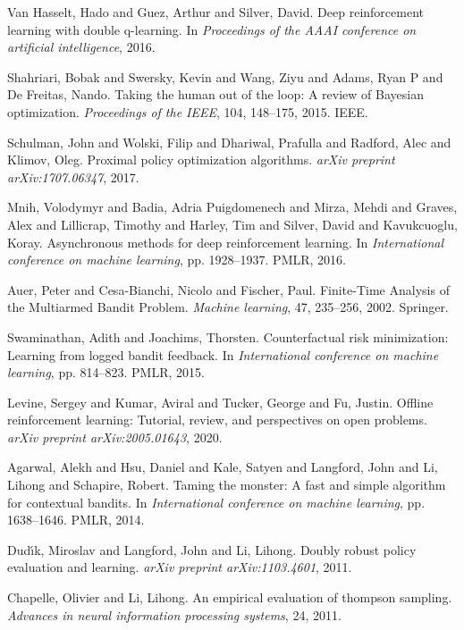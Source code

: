 \begin{thebibliography}{99}
 Van Hasselt, Hado and Guez, Arthur and Silver, David. {D}eep reinforcement learning with double q-learning. In \textit{Proceedings of the AAAI conference on artificial intelligence}, 2016.

 Shahriari, Bobak and Swersky, Kevin and Wang, Ziyu and Adams, Ryan P and De Freitas, Nando. {T}aking the human out of the loop: {A} review of {B}ayesian optimization. \textit{Proceedings of the IEEE}, 104, 148--175, 2015. IEEE.

 Schulman, John and Wolski, Filip and Dhariwal, Prafulla and Radford, Alec and Klimov, Oleg. {P}roximal policy optimization algorithms. \textit{arXiv preprint arXiv:1707.06347}, 2017.

 Mnih, Volodymyr and Badia, Adria Puigdomenech and Mirza, Mehdi and Graves, Alex and Lillicrap, Timothy and Harley, Tim and Silver, David and Kavukcuoglu, Koray. {A}synchronous methods for deep reinforcement learning. In \textit{International conference on machine learning}, pp. 1928--1937. PMLR, 2016.

 Auer, Peter and Cesa-Bianchi, Nicolo and Fischer, Paul. {F}inite-{T}ime {A}nalysis of the {M}ultiarmed {B}andit {P}roblem. \textit{Machine learning}, 47, 235--256, 2002. Springer.

 Swaminathan, Adith and Joachims, Thorsten. {C}ounterfactual risk minimization: {L}earning from logged bandit feedback. In \textit{International conference on machine learning}, pp. 814--823. PMLR, 2015.

 Levine, Sergey and Kumar, Aviral and Tucker, George and Fu, Justin. {O}ffline reinforcement learning: {T}utorial, review, and perspectives on open problems. \textit{arXiv preprint arXiv:2005.01643}, 2020.

 Agarwal, Alekh and Hsu, Daniel and Kale, Satyen and Langford, John and Li, Lihong and Schapire, Robert. {T}aming the monster: {A} fast and simple algorithm for contextual bandits. In \textit{International conference on machine learning}, pp. 1638--1646. PMLR, 2014.

 Dud{\i}́k, Miroslav and Langford, John and Li, Lihong. {D}oubly robust policy evaluation and learning. \textit{arXiv preprint arXiv:1103.4601}, 2011.

 Chapelle, Olivier and Li, Lihong. {A}n empirical evaluation of thompson sampling. \textit{Advances in neural information processing systems}, 24, 2011.


\end{thebibliography}
